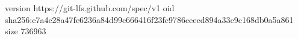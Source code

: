 version https://git-lfs.github.com/spec/v1
oid sha256:c7a4e28a47fe6236a84d99c666416f23fc9786eeeed894a33c9c168db0a5a861
size 736963
